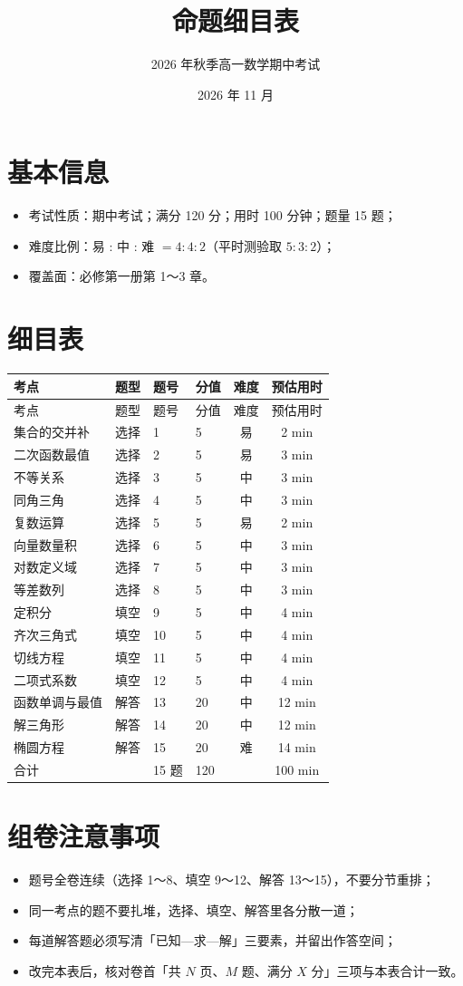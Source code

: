 \documentclass[11pt]{ctexart}
\title{命题细目表}
\author{2026 年秋季高一数学期中考试}
\date{2026 年 11 月}
\begin{document}
\maketitle

\section{基本信息}
\begin{itemize}
  \item 考试性质：期中考试；满分 120 分；用时 100 分钟；题量 15 题；
  \item 难度比例：易 : 中 : 难 $=4:4:2$（平时测验取 $5:3:2$）；
  \item 覆盖面：必修第一册第 1～3 章。
\end{itemize}

\section{细目表}
\begin{longtable}{llllcc}
\toprule
考点 & 题型 & 题号 & 分值 & 难度 & 预估用时 \\
\midrule
\endfirsthead
\toprule
考点 & 题型 & 题号 & 分值 & 难度 & 预估用时 \\
\midrule
\endhead
集合的交并补 & 选择 & 1 & 5 & 易 & 2 min \\
二次函数最值 & 选择 & 2 & 5 & 易 & 3 min \\
不等关系 & 选择 & 3 & 5 & 中 & 3 min \\
同角三角 & 选择 & 4 & 5 & 中 & 3 min \\
复数运算 & 选择 & 5 & 5 & 易 & 2 min \\
向量数量积 & 选择 & 6 & 5 & 中 & 3 min \\
对数定义域 & 选择 & 7 & 5 & 中 & 3 min \\
等差数列 & 选择 & 8 & 5 & 中 & 3 min \\
定积分 & 填空 & 9 & 5 & 中 & 4 min \\
齐次三角式 & 填空 & 10 & 5 & 中 & 4 min \\
切线方程 & 填空 & 11 & 5 & 中 & 4 min \\
二项式系数 & 填空 & 12 & 5 & 中 & 4 min \\
函数单调与最值 & 解答 & 13 & 20 & 中 & 12 min \\
解三角形 & 解答 & 14 & 20 & 中 & 12 min \\
椭圆方程 & 解答 & 15 & 20 & 难 & 14 min \\
\midrule
合计 & & 15 题 & 120 & & 100 min \\
\bottomrule
\end{longtable}

\section{组卷注意事项}
\begin{itemize}
  \item 题号全卷连续（选择 1～8、填空 9～12、解答 13～15），不要分节重排；
  \item 同一考点的题不要扎堆，选择、填空、解答里各分散一道；
  \item 每道解答题必须写清「已知—求—解」三要素，并留出作答空间；
  \item 改完本表后，核对卷首「共 $N$ 页、$M$ 题、满分 $X$ 分」三项与本表合计一致。
\end{itemize}
\end{document}

